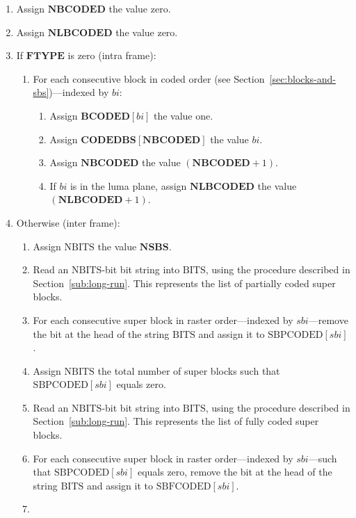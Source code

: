 \documentclass[11pt,letterpaper]{book}
\newcommand{\idx}[1]{{\ensuremath{\mathit{#1}}}}
\newcommand{\sbi}{\idx{sbi}}
\newcommand{\bi}{\idx{bi}}
\newcommand{\bitvar}[1]{\ensuremath{\mathbf{\bm #1}}}
\newcommand{\locvar}[1]{\ensuremath{\mathrm{#1}}}
\numberwithin{equation}{chapter}
\numberwithin{figure}{chapter}
\numberwithin{table}{chapter}
\begin{document}
\begin{enumerate}
\item
Assign \bitvar{NBCODED} the value zero.
\item
Assign \bitvar{NLBCODED} the value zero.
\item
If \bitvar{FTYPE} is zero (intra frame):
\begin{enumerate}
\item
For each consecutive block in coded order (see
 Section~\ref{sec:blocks-and-sbs})---indexed by \locvar{\bi}:
\begin{enumerate}
\item
Assign $\bitvar{BCODED}[\locvar{\bi}]$ the value one.
\item
Assign $\bitvar{CODEDBS}[\bitvar{NBCODED}]$ the value \locvar{\bi}.
\item
Assign \bitvar{NBCODED} the value $(\bitvar{NBCODED}+1)$.
\item
If \locvar{\bi} is in the luma plane, assign \bitvar{NLBCODED} the value
 $(\bitvar{NLBCODED}+1)$.
\end{enumerate}
\end{enumerate}
\item
Otherwise (inter frame):
\begin{enumerate}
\item
Assign \locvar{NBITS} the value \bitvar{NSBS}.
\item
Read an \locvar{NBITS}-bit bit string into \locvar{BITS}, using the procedure
 described in Section~\ref{sub:long-run}.
This represents the list of partially coded super blocks.
\item
For each consecutive super block in raster order---indexed by
 \locvar{\sbi}---remove the bit at the head of the string \locvar{BITS} and
 assign it to $\locvar{SBPCODED}[\locvar{\sbi}]$.
\item
Assign \locvar{NBITS} the total number of super blocks such that \\
 $\locvar{SBPCODED}[\locvar{\sbi}]$ equals zero.
\item
Read an \locvar{NBITS}-bit bit string into \locvar{BITS}, using the procedure
 described in Section~\ref{sub:long-run}.
This represents the list of fully coded super blocks.
\item
For each consecutive super block in raster order---indexed by
 \locvar{\sbi}---such that $\locvar{SBPCODED}[\locvar{\sbi}]$ equals zero,
 remove the bit at the head of the string \locvar{BITS} and assign it to
 $\locvar{SBFCODED}[\locvar{\sbi}]$.
\item

\end{enumerate}
\end{enumerate}
\end{document}
